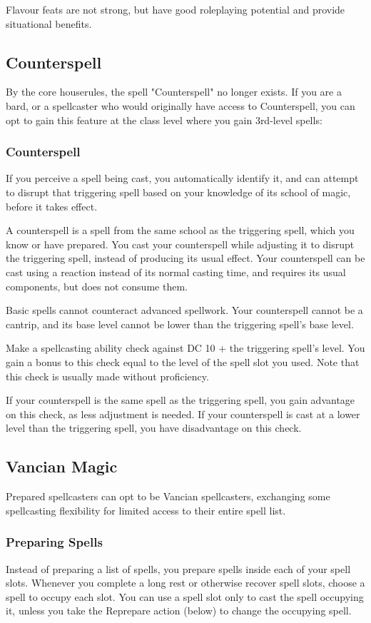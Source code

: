 \documentclass[letterpaper,twocolumn,openany,nodeprecatedcode,bg=print]{dndbook}
\begin{document}
Flavour feats are not strong, but have good roleplaying potential and provide situational benefits.

\subsection{Counterspell}
\label{counterspell}
By the core houserules, the spell "Counterspell" no longer exists. If you are a bard, or a spellcaster who would originally have access to Counterspell, you can opt to gain this feature at the class level where you gain 3rd-level spells:

\subsubsection{Counterspell}
If you perceive a spell being cast, you automatically identify it, and can attempt to disrupt that triggering spell based on your knowledge of its school of magic, before it takes effect.

A counterspell is a spell from the same school as the triggering spell, which you know or have prepared. You cast your counterspell while adjusting it to disrupt the triggering spell, instead of producing its usual effect. Your counterspell can be cast using a reaction instead of its normal casting time, and requires its usual components, but does not consume them.

Basic spells cannot counteract advanced spellwork. Your counterspell cannot be a cantrip, and its base level cannot be lower than the triggering spell's base level.

Make a spellcasting ability check against DC 10 + the triggering spell's level. You gain a bonus to this check equal to the level of the spell slot you used. Note that this check is usually made without proficiency.

If your counterspell is the same spell as the triggering spell, you gain advantage on this check, as less adjustment is needed. If your counterspell is cast at a lower level than the triggering spell, you have disadvantage on this check.

\subsection{Vancian Magic}
Prepared spellcasters can opt to be Vancian spellcasters, exchanging some spellcasting flexibility for limited access to their entire spell list.

\subsubsection{Preparing Spells}
Instead of preparing a list of spells, you prepare spells inside each of your spell slots. Whenever you complete a long rest or otherwise recover spell slots, choose a spell to occupy each slot. You can use a spell slot only to cast the spell occupying it, unless you take the Reprepare action (below) to change the occupying spell.
\end{document}
